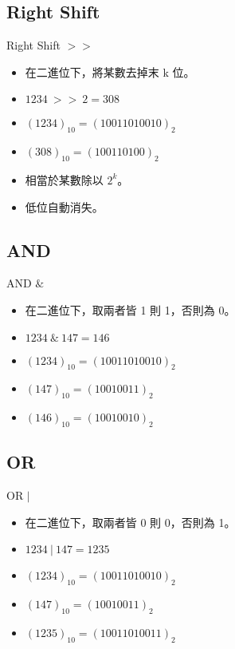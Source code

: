 \documentclass[t]{beamer}
\begin{document}
\subsection{Right Shift}
\begin{frame}{Right Shift $>>$}
  \begin{itemize}
    \item 在二進位下，將某數去掉末 k 位。
    \item $1234\ >>\ 2 = 308$
    \item $(1234)_{10} = (10011010010)_{2}$
    \item $(308)_{10} = (100110100)_{2}$
    \item 相當於某數除以 $2^{k}$。
    \item 低位自動消失。
  \end{itemize}
\end{frame}

\subsection{AND}
\begin{frame}{AND $\&$}
  \begin{itemize}
    \item 在二進位下，取兩者皆 1 則 1，否則為 0。
    \item $1234\ \&\ 147 = 146$
    \item $(1234)_{10} = (10011010010)_{2}$
    \item $(147)_{10} = (10010011)_{2}$
    \item $(146)_{10} = (10010010)_{2}$
  \end{itemize}
\end{frame}

\subsection{OR}
\begin{frame}{OR $|$}
  \begin{itemize}
    \item 在二進位下，取兩者皆 0 則 0，否則為 1。
    \item $1234\ |\ 147 = 1235$
    \item $(1234)_{10} = (10011010010)_{2}$
    \item $(147)_{10} = (10010011)_{2}$
    \item $(1235)_{10} = (10011010011)_{2}$
  \end{itemize}
\end{frame}
\end{document}
